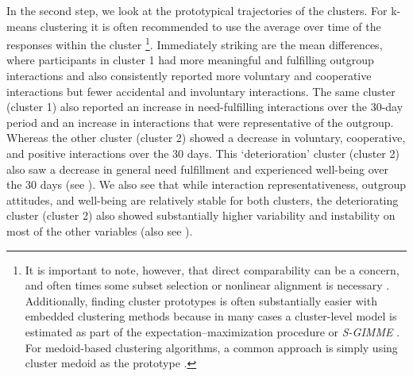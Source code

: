 In the second step, we look at the prototypical trajectories of the
clusters. For k-means clustering it is often recommended to use the
average over time of the responses within the cluster
\citep[see ;][]{niennattrakul2007}\footnote{It is important to note, however, that direct comparability can be a concern, and often times some subset selection or nonlinear alignment is necessary \citep[e.g.,][]{gupta1996}. Additionally, finding cluster prototypes is often substantially easier with embedded clustering methods because in many cases a cluster-level model is estimated as part of the expectation–maximization procedure \citep[e.g.,][]{denteuling2021} or \textit{S-GIMME} \citep[e.g.][]{lane2019}. For medoid-based clustering algorithms, a common approach is simply using cluster medoid as the prototype \citep{kaufman1990}.}.
Immediately striking are the mean differences, where participants in
cluster 1 had more meaningful and fulfilling outgroup interactions and
also consistently reported more voluntary and cooperative interactions
but fewer accidental and involuntary interactions. The same cluster
(cluster 1) also reported an increase in need-fulfilling interactions
over the 30-day period and an increase in interactions that were
representative of the outgroup. Whereas the other cluster (cluster 2)
showed a decrease in voluntary, cooperative, and positive interactions
over the 30 days. This `deterioration' cluster (cluster 2) also saw a
decrease in general need fulfillment and experienced well-being over the
30 days (see ). We also see that while
interaction representativeness, outgroup attitudes, and well-being are
relatively stable for both clusters, the deteriorating cluster (cluster
2) also showed substantially higher variability and instability on most
of the other variables (also see ).

